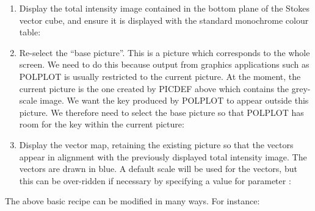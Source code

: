 \documentclass[twoside,11pt]{starlink}
\begin{document}
\begin{enumerate}
\item \label{STEP:DISPLAY} Display the total intensity image contained in the bottom plane of
the Stokes vector cube, and ensure it is displayed with the standard
monochrome colour table:
\begin{terminalv}
\end{terminalv}

\item \label{STEP:PICLIST} Re-select the ``base picture''. This is a
picture which corresponds to the whole screen. We need to do this because
output from graphics applications such as POLPLOT is usually restricted
to the current picture. At the moment, the current picture is the one
created by PICDEF above which contains the grey-scale image. We want the
key produced by POLPLOT to appear outside this picture. We therefore need
to select the base picture so that POLPLOT has room for the key within
the current picture:
\begin{terminalv}
\end{terminalv}

\item \label{STEP:POLPLOT} Display the vector map, retaining the existing picture so that the
vectors appear in alignment with the previously displayed total intensity
image. The vectors are drawn in blue. A default scale will be used for the
vectors, but this can be over-ridden if necessary by specifying a value for
parameter :
\begin{terminalv}
\end{terminalv}

\end{enumerate}

The above basic recipe can be modified in many ways. For instance:
\end{document}
